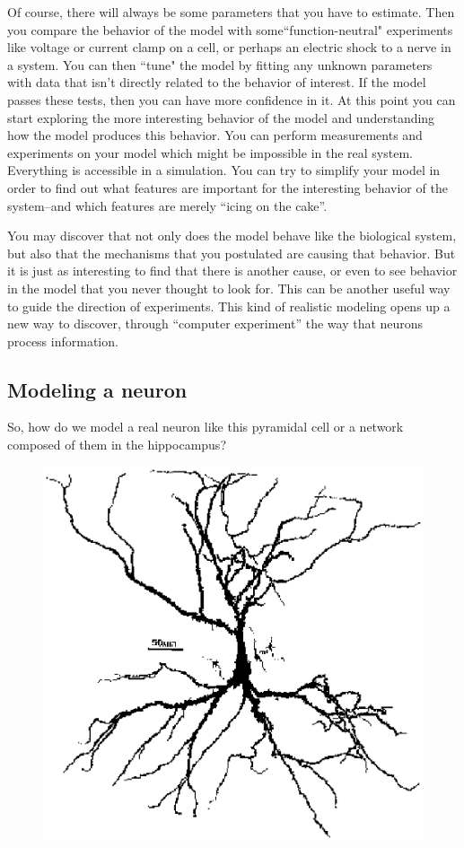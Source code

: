 \documentclass[12pt]{article}
\begin{document}
Of course, there will always be some parameters that you have to estimate. Then you compare the behavior of the model with some``function-neutral" experiments like voltage or current clamp on a cell, or perhaps an electric shock to a nerve in a system. You can then ``tune" the model by fitting any unknown parameters with data that isn't directly related to the behavior of interest. If the model passes these tests, then you can have more confidence in it. At this point you can start exploring the more interesting behavior of the model and understanding how the model produces this behavior. You can perform measurements and experiments on your model which might be impossible in the real system. Everything is accessible in a simulation. You can try to simplify your model in order to find out what features are important for the interesting behavior of the system--and which features are merely ``icing on the cake''.

You may discover that not only does the model behave like the biological system, but also that the mechanisms that you postulated are causing that behavior. But it is just as interesting to find that there is another cause, or even to see behavior in the model that you never thought to look for. This can be another useful way to guide the direction of experiments. This kind of realistic modeling opens up a new way to discover, through ``computer experiment'' the way that neurons process information.

\subsection*{Modeling a neuron}

So, how do we model a real neuron like this pyramidal cell or a network composed of them in the hippocampus?

\begin{figure}[h]
  \centering
 \includegraphics[scale=0.6]{figures/ca3smaller.eps}
  \label{fig:ca3smaller}
\end{figure}
\end{document}
